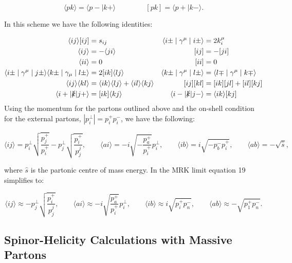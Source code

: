 	\begin{equation}
	\langle pk\rangle = \langle p-\mid k+\rangle \hspace{50pt} [pk] = \langle p+\mid k-\rangle.
	\end{equation}

	In this scheme we have the following identities:

	\begin{align}
	\langle ij\rangle[ij] &= s_{ij} & \langle i\pm\mid\gamma^\mu\mid i\pm\rangle &= 2k_i^\mu \\
	\langle ij\rangle &= -\langle ji\rangle & [ij] &= -[ji] \\
	\langle ii\rangle &= 0 & [ii] &= 0 \\
	\langle i\pm\mid\gamma^\mu\mid j\pm\rangle\langle k\pm\mid\gamma_\mu\mid l\pm\rangle &= 2[ik]\langle l j\rangle & \langle k\pm\mid\gamma^\mu\mid l\pm\rangle &= \langle l\mp\mid\gamma^\mu\mid k\mp\rangle \\
	\langle i j\rangle\langle k l\rangle &= \langle i k\rangle\langle l j\rangle + \langle i l\rangle\langle k j\rangle & [ij][kl] &= [ik][jl]+[il][kj] \\
	\langle i+|\slashed k|j+\rangle &= [ik]\langle kj\rangle & \langle i-|\slashed k|j-\rangle &= \langle	 ik\rangle [kj]
	\end{align}
	Using the momentum for the partons outlined above and the on-shell condition for the external partons, $|p_i^\perp|=p_i^+p_i^-$, we have the following:

	\begin{equation}
	\langle ij\rangle = p_i^\perp\sqrt{\frac{p_j^+}{p_i^+}} - p_j^\perp\sqrt{\frac{p_i^+}{p_j^j}},
	\qquad
	\langle ai\rangle = -i\sqrt{-\frac{p_a^+}{p_i^+}}p_i^\perp,
	\qquad
	\langle ib\rangle = i\sqrt{-p_b^-p_i^+},
	\qquad
	\langle ab\rangle = -\sqrt{\hat{s}},
	\end{equation}

	where $\hat{s}$ is the partonic centre of mass energy.  In the MRK limit equation 19 simplifies to:

	\begin{equation}
	\langle ij\rangle \approx - p_j^\perp\sqrt{\frac{p_i^+}{p_j^j}},
	\qquad
	\langle ai\rangle \approx -i\sqrt{\frac{p_a^+}{p_i^+}}p_i^\perp,
	\qquad
	\langle ib\rangle \approx i\sqrt{p_i^+p_n^-},
	\qquad
	\langle ab\rangle \approx -\sqrt{p_1^+p_n^-}.
	\end{equation}

	\subsection{Spinor-Helicity Calculations with Massive Partons}
	\label{sub:SMMassive}

